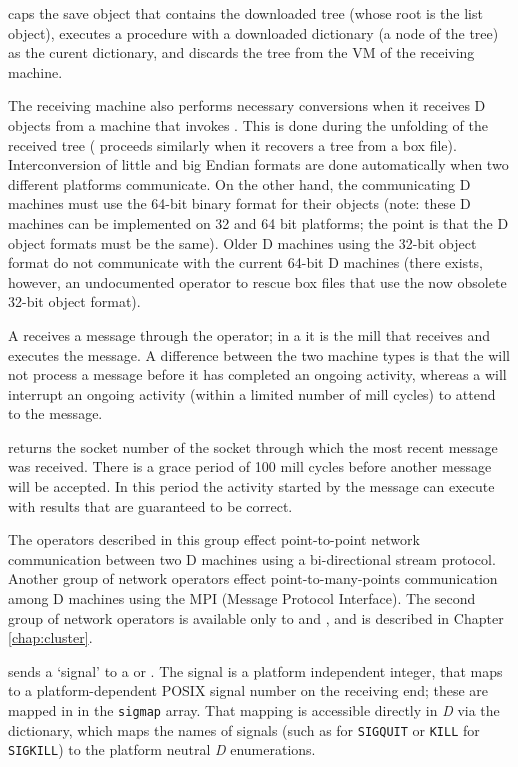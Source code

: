 \noindent caps the save object that contains the downloaded tree
(whose root is the list object), executes a procedure with a
downloaded dictionary (a node of the tree) as the curent dictionary,
and discards the tree from the VM of the receiving machine.

The receiving machine also performs necessary conversions when it
receives D objects from a machine that invokes . This is done
during the unfolding of the received tree ( proceeds
similarly when it recovers a tree from a box file). Interconversion of
little and big Endian formats are done automatically when two
different platforms communicate. On the other hand, the communicating
D machines must use the 64-bit binary format for their objects (note:
these D machines can be implemented on 32 and 64 bit platforms; the
point is that the D object formats must be the same). Older D machines
using the 32-bit object format do not communicate with the current
64-bit D machines (there exists, however, an undocumented operator to
rescue box files that use the now obsolete 32-bit object format).
  

A  receives a  message through the 
operator; in a  it is the mill that receives and executes
the message. A difference between the two machine types is that the
 will not process a message before it has completed an
ongoing activity, whereas a  will interrupt an ongoing
activity (within a limited number of mill cycles) to attend to the
message.

 returns the socket number of the socket through which
the most recent message was received. There is a grace period of 100
mill cycles before another message will be accepted. In this period
the activity started by the message can execute  with
results that are guaranteed to be correct.

The operators described in this group effect point-to-point network
communication between two D machines using a bi-directional stream
protocol. Another group of network operators effect
point-to-many-points communication among D machines using the MPI
(Message Protocol Interface). The second group of network operators is
available only to  and , and
is described in Chapter \ref{chap:cluster}.

 sends a `signal' to a  or . The
signal is a platform independent integer, that maps to a
platform-dependent POSIX signal number on the receiving end; these are
mapped in  in the \texttt{sigmap} array. That
mapping is accessible directly in \emph{D} via the 
dictionary, which maps the names of signals (such as 
for \texttt{SIGQUIT} or \texttt{KILL} for \texttt{SIGKILL}) to the
platform neutral \emph{D} enumerations.

